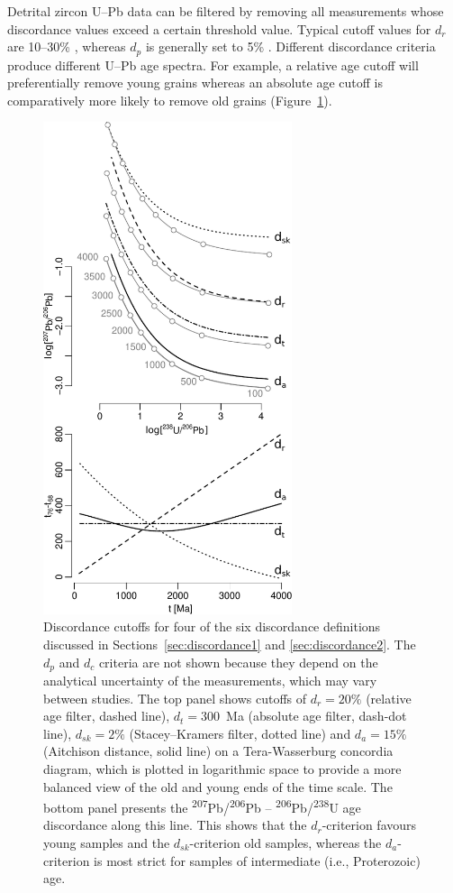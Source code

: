 \documentclass[gchron, manuscript]{copernicus}
\begin{document}
Detrital zircon U--Pb data can be filtered by removing all
measurements whose discordance values exceed a certain threshold
value. Typical cutoff values for $d_r$ are 10--30\%
\citep{gehrels2011}, whereas $d_p$ is generally set to 5\%
\citep{spencer2016}. Different discordance criteria produce different
U--Pb age spectra. For example, a relative age cutoff will
preferentially remove young grains whereas an absolute age cutoff is
comparatively more likely to remove old grains
(Figure~\ref{fig:agediscordance}).

\begin{figure}[t]
  \includegraphics[width=7.3cm]{TW-option-1234.pdf}
  \caption{Discordance cutoffs for four of the six discordance
    definitions discussed in Sections~\ref{sec:discordance1} and
    \ref{sec:discordance2}. The $d_{p}$ and $d_c$ criteria are not
    shown because they depend on the analytical uncertainty of the
    measurements, which may vary between studies. The top panel shows
    cutoffs of $d_r=20\%$ (relative age filter, dashed line),
    $d_t=300$~Ma (absolute age filter, dash-dot line), $d_{sk}=2\%$
    (Stacey--Kramers filter, dotted line) and $d_{a}=15\%$ (Aitchison
    distance, solid line) on a Tera-Wasserburg concordia diagram,
    which is plotted in logarithmic space to provide a more balanced
    view of the old and young ends of the time scale. The bottom panel
    presents the \textsuperscript{207}Pb/\textsuperscript{206}Pb --
    \textsuperscript{206}Pb/\textsuperscript{238}U age discordance
    along this line. This shows that the $d_r$-criterion favours young
    samples and the $d_{sk}$-criterion old samples, whereas the
    $d_a$-criterion is most strict for samples of intermediate (i.e.,
    Proterozoic) age. }
  \label{fig:agediscordance}
\end{figure}
\end{document}
